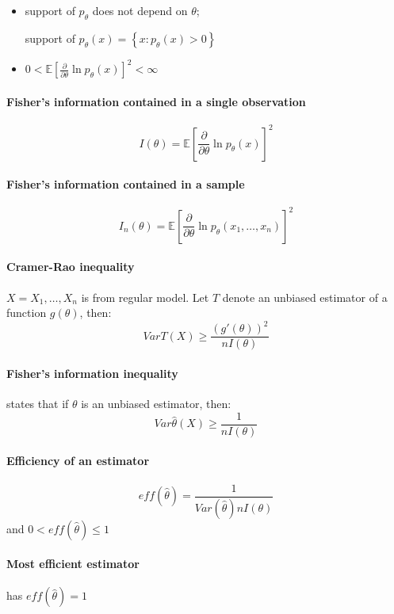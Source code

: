 \begin{itemize}[noitemsep,nolistsep]
  \item support of $p_\theta$ does not depend on $\theta$; 
  
  support of $ p_\theta(x) = \left\{ x: p_\theta(x) > 0 \right\} $
  
  \item $ 0 < \mathbb{E} \left[ \frac{\partial}{\partial\theta} \ln p_\theta(x) \right]^2 < \infty $
\end{itemize}

\paragraph{Fisher's information contained in a single observation}
\[ I(\theta) = \mathbb{E} \left[ \frac{\partial}{\partial\theta} \ln p_\theta(x) \right]^2  \]

\paragraph{Fisher's information contained in a sample}
\[ I_n(\theta) = \mathbb{E} \left[ \frac{\partial}{\partial\theta} \ln p_\theta(x_1,\ldots,x_n) \right]^2  \]

\paragraph{Cramer-Rao inequality}
$X = X_1,\ldots,X_n$ is from regular model. Let $T$ denote
an unbiased estimator of a function $g(\theta)$, then:
\[ Var T(X) \geq \frac{\left( g'( \theta ) \right)^2}{n I(\theta)} \]

\paragraph{Fisher's information inequality}
states that if $\theta$ is an unbiased estimator, then:
\[ Var\hat\theta(X) \geq \frac{1}{n I(\theta)} \]

\paragraph{Efficiency of an estimator}
\[ eff(\hat\theta) = \frac{1}{Var(\hat\theta) n I(\theta)} \]
and $0 < eff(\hat\theta) \leq 1$

\paragraph{Most efficient estimator}
has $eff(\hat\theta) = 1$

